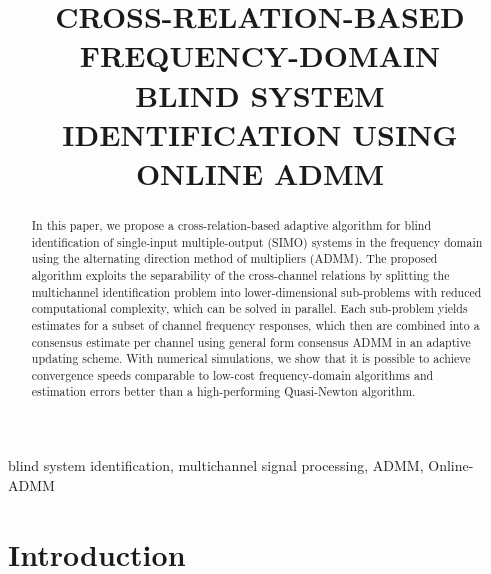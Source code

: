 \documentclass{article}
\title{CROSS-RELATION-BASED FREQUENCY-DOMAIN\\ BLIND SYSTEM IDENTIFICATION USING ONLINE ADMM}
\begin{document}
%
\maketitle
%
\begin{abstract}
    In this paper, we propose a cross-relation-based adaptive algorithm for blind identification of single-input multiple-output (SIMO) systems in the frequency domain using the alternating direction method of multipliers (ADMM).
    The proposed algorithm exploits the separability of the cross-channel relations by splitting the multichannel identification problem into lower-dimensional sub-problems with reduced computational complexity, which can be solved in parallel.
    Each sub-problem yields estimates for a subset of channel frequency responses, which then are combined into a consensus estimate per channel using general form consensus ADMM in an adaptive updating scheme.
    With numerical simulations, we show that it is possible to achieve convergence speeds comparable to low-cost frequency-domain algorithms and estimation errors better than a high-performing Quasi-Newton algorithm.
\end{abstract}
%
\begin{keywords}
    blind system identification, multichannel signal processing, ADMM, Online-ADMM
\end{keywords}
%
\section{Introduction}
\label{sec:intro}
\end{document}
